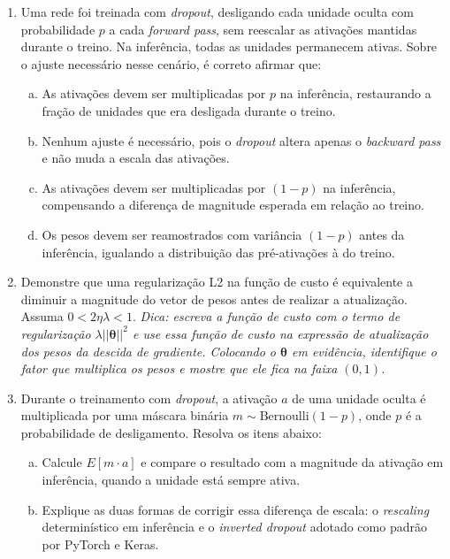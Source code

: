 \documentclass{dlproblemset}
\begin{document}
\begin{enumerate}[1)]
    \item Uma rede foi treinada com \textit{dropout}, desligando cada unidade oculta com probabilidade $p$ a cada \textit{forward pass}, sem reescalar as ativações mantidas durante o treino. Na inferência, todas as unidades permanecem ativas. Sobre o ajuste necessário nesse cenário, é correto afirmar que:
    \begin{enumerate}[(a)]
        \item As ativações devem ser multiplicadas por $p$ na inferência, restaurando a fração de unidades que era desligada durante o treino.
        \item Nenhum ajuste é necessário, pois o \textit{dropout} altera apenas o \textit{backward pass} e não muda a escala das ativações.
        \item As ativações devem ser multiplicadas por $(1-p)$ na inferência, compensando a diferença de magnitude esperada em relação ao treino.
        \item Os pesos devem ser reamostrados com variância $(1-p)$ antes da inferência, igualando a distribuição das pré-ativações à do treino.
    \end{enumerate}

    \item Demonstre que uma regularização L2 na função de custo é equivalente a diminuir a magnitude do vetor de pesos antes de realizar a atualização. Assuma $0 < 2\eta\lambda < 1$. \textit{Dica: escreva a função de custo com o termo de regularização $\lambda||\boldsymbol{\theta}||^2$ e use essa função de custo na expressão de atualização dos pesos da descida de gradiente. Colocando o $\boldsymbol{\theta}$ em evidência, identifique o fator que multiplica os pesos e mostre que ele fica na faixa $(0,1)$.}

    \item Durante o treinamento com \textit{dropout}, a ativação $a$ de uma unidade oculta é multiplicada por uma máscara binária $m \sim \text{Bernoulli}(1-p)$, onde $p$ é a probabilidade de desligamento. Resolva os itens abaixo:
    \begin{enumerate}[a)]
        \item Calcule $E[m \cdot a]$ e compare o resultado com a magnitude da ativação em inferência, quando a unidade está sempre ativa.
        \item Explique as duas formas de corrigir essa diferença de escala: o \textit{rescaling} determinístico em inferência e o \textit{inverted dropout} adotado como padrão por PyTorch e Keras.
    \end{enumerate}


\end{enumerate}
\end{document}
